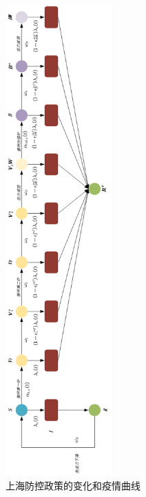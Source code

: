 \documentclass[bwprint]{gmcmthesis}
\numberwithin{figure}{section}
\begin{document}
\begin{figure}[!h]
\centering
\includegraphics[width=0.36\textwidth]{vaccine.png}
\caption{上海防控政策的变化和疫情曲线}
\label{vac}
\end{figure}
\end{document}
